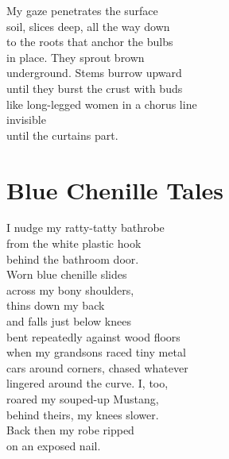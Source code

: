 \documentclass[twoside,10pt]{book}
\begin{document}
My gaze penetrates the surface\\
soil, slices deep, all the way down\\
to the roots that anchor the bulbs\\
in place. They sprout brown\\
underground. Stems burrow upward\\
until they burst the crust with buds\\
like long-legged women in a chorus line\\
invisible\\
until the curtains part.


\clearpage
\section{Blue Chenille Tales}

I nudge my ratty-tatty bathrobe\\
from the white plastic hook\\
behind the bathroom door.\\
Worn blue chenille slides\\
across my bony shoulders,\\
thins down my back\\
and falls just below knees\\
bent repeatedly against wood floors\\
when my grandsons raced tiny metal\\
cars around corners, chased whatever\\
lingered around the curve. I, too,\\
roared my souped-up Mustang,\\
behind theirs, my knees slower.\\
Back then my robe ripped\\
on an exposed nail.
\end{document}
